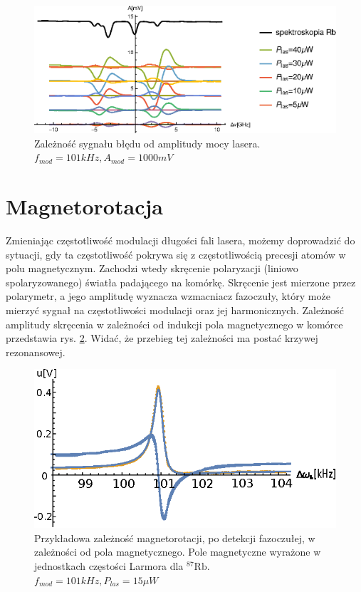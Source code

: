 \documentclass[a4paper,10pt]{article}
\begin{document}
\begin{figure}[h!]
\centering
 \includegraphics[width=\textwidth]{panoramy_1H_odp.eps}
 \caption{Zależność sygnału błędu od amplitudy mocy lasera. $f_{mod}=101kHz, A_{mod}=1000mV$}
 \label{fig:panodp}
\end{figure}

\section{Magnetorotacja}
\label{sec:magnetorotacja}


Zmieniając częstotliwość modulacji długości fali lasera, możemy doprowadzić do sytuacji, gdy ta częstotliwość pokrywa się z częstotliwością precesji atomów w polu magnetycznym.
Zachodzi wtedy skręcenie polaryzacji (liniowo spolaryzowanego) światła padającego na komórkę. Skręcenie jest mierzone przez polarymetr, a jego amplitudę wyznacza wzmacniacz fazoczuły, który może mierzyć sygnał na częstotliwości modulacji oraz jej harmonicznych. Zależność amplitudy skręcenia w zależności od indukcji pola magnetycznego w komórce przedstawia rys. \ref{fig:magnetorot1}. Widać, że przebieg tej zależności ma postać krzywej rezonansowej.

\begin{figure}[h!]
\centering
 \includegraphics[width=\textwidth]{magnetorot1.eps}
 \caption{Przykładowa zależność magnetorotacji, po detekcji fazoczułej, w zależności od pola magnetycznego. Pole magnetyczne wyrażone w jednostkach częstości Larmora dla ${}^{87} \mathrm{Rb}$.
 $f_{mod}=101kHz, P_{las}=15 \mu W$}
 \label{fig:magnetorot1}
\end{figure}
\end{document}
